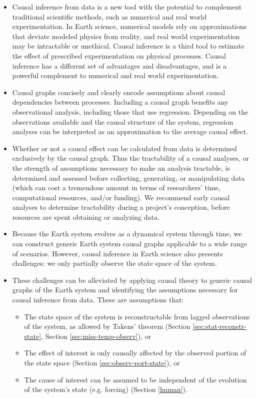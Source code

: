 \documentclass[12pt]{article}
\begin{document}
\begin{itemize}
\item Causal inference from data is a new tool with the potential to
  complement traditional scientific methods, such as numerical and
  real world experimentation. In Earth science, numerical models rely
  on approximations that deviate modeled physics from reality, and
  real world experimentation may be intractable or unethical. Causal
  inference is a third tool to estimate the effect of prescribed
  experimentation on physical processes. Causal inference has a
  different set of advantages and disadvantages, and is a powerful
  complement to numerical and real world experimentation.
\item Causal graphs concisely and clearly encode assumptions about
  causal dependencies between processes. Including a causal graph
  benefits any observational analysis, including those that use
  regression. Depending on the observations available and the causal
  structure of the system, regression analyses can be interpreted as
  an approximation to the average causal effect.
\item Whether or not a causal effect can be calculated from data is
  determined exclusively by the causal graph. Thus the tractability of
  a causal analyses, or the strength of assumptions necessary to make
  an analysis tractable, is determined and assessed before collecting,
  generating, or manipulating data (which can cost a tremendous amount
  in terms of researchers' time, computational resources, and/or
  funding). We recommend early causal analyses to determine
  tractability during a project's conception, before resources are
  spent obtaining or analyzing data.
\item Because the Earth system evolves as a dynamical system through
  time, we can construct generic Earth system causal graphs
  applicable to a wide range of scenarios. However, causal inference
  in Earth science also presents challenges: we only partially observe
  the state space of the system.
\item These challenges can be alleviated by applying causal theory to
  generic causal graphs of the Earth system and identifying the
  assumptions necessary for causal inference from data. These are
  assumptions that:
  \begin{itemize}
  \item The state space of the system is reconstructable
    from lagged observations of the system, as allowed by
    Takens' theorem (Section \ref{sec:stat-reconstr-state}, Section \ref{sec:miss-temp-observ}), or
  \item The effect of interest is only causally
    affected by the observed portion of the state space (Section
    \ref{sec:observ-port-state}), or
  \item The cause of interest can be assumed to be independent of the
    evolution of the system's state (e.g. forcing) (Section
    \ref{human}).
  \end{itemize}
\end{itemize}
\end{document}
